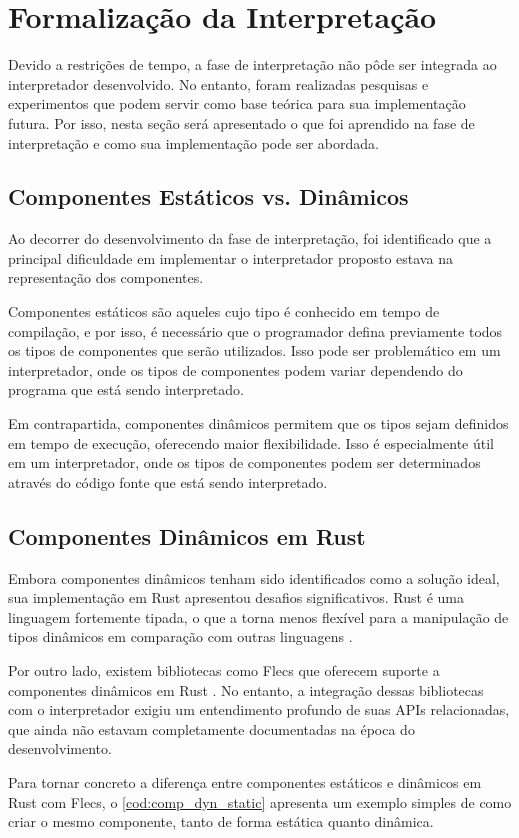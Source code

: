 \section{Formalização da Interpretação} \label{sec:interpretacao}

Devido a restrições de tempo, a fase de interpretação não pôde ser integrada ao interpretador desenvolvido. No entanto, foram realizadas pesquisas e experimentos que podem servir como base teórica para sua implementação futura. Por isso, nesta seção será apresentado o que foi aprendido na fase de interpretação e como sua implementação pode ser abordada.

\subsection{Componentes Estáticos vs. Dinâmicos}

Ao decorrer do desenvolvimento da fase de interpretação, foi identificado que a principal dificuldade em implementar o interpretador proposto estava na representação dos componentes.

Componentes estáticos são aqueles cujo tipo é conhecido em tempo de compilação, e por isso, é necessário que o programador defina previamente todos os tipos de componentes que serão utilizados. Isso pode ser problemático em um interpretador, onde os tipos de componentes podem variar dependendo do programa que está sendo interpretado.

Em contrapartida, componentes dinâmicos permitem que os tipos sejam definidos em tempo de execução, oferecendo maior flexibilidade. Isso é especialmente útil em um interpretador, onde os tipos de componentes podem ser determinados através do código fonte que está sendo interpretado.

\subsection{Componentes Dinâmicos em Rust}

Embora componentes dinâmicos tenham sido identificados como a solução ideal, sua implementação em Rust apresentou desafios significativos. Rust é uma linguagem fortemente tipada, o que a torna menos flexível para a manipulação de tipos dinâmicos em comparação com outras linguagens \cite{rustbook}.

Por outro lado, existem bibliotecas como Flecs que oferecem suporte a componentes dinâmicos em Rust \cite{flecs}. No entanto, a integração dessas bibliotecas com o interpretador exigiu um entendimento profundo de suas APIs relacionadas, que ainda não estavam completamente documentadas na época do desenvolvimento.

Para tornar concreto a diferença entre componentes estáticos e dinâmicos em Rust com Flecs, o \autoref{cod:comp_dyn_static} apresenta um exemplo simples de como criar o mesmo componente, tanto de forma estática quanto dinâmica.

\codigoRust

\vspace{-1em}
